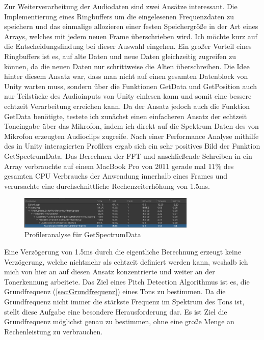Zur Weiterverarbeitung der Audiodaten sind zwei Ansätze interessant. Die Implementierung eines Ringbuffers um die eingelesenen Frequenzdaten zu speichern und das einmalige allozieren einer festen Speichergröße in der Art eines Arrays, welches mit jedem neuen Frame überschrieben wird. Ich möchte kurz auf die Entscheidungsfindung bei dieser Auswahl eingehen. Ein großer Vorteil eines Ringbuffers ist es, auf alte Daten und neue Daten gleichzeitig zugreifen zu können, da die neuen Daten nur schrittweise die Alten überschreiben. Die Idee hinter diesem Ansatz war, dass man nicht auf einen gesamten Datenblock von Unity warten muss, sondern über die Funktionen GetData und GetPosition \cite{unity_doku_micro} auch nur Teilstücke des Audioinputs von Unity einlesen kann und somit eine bessere echtzeit Verarbeitung erreichen kann. Da der Ansatz jedoch auch die Funktion GetData benötigte, testete ich zunächst einen einfacheren Ansatz der echtzeit Toneingabe über das Mikrofon, indem ich direkt auf die Spektrum Daten des von Mikrofon erzeugten Audioclips zugreife. Nach einer Performance Analyse mithilfe des in Unity interagierten Profilers ergab sich ein sehr positives Bild der Funktion GetSpectrumData. Das Berechnen der FFT und anschließende Schreiben in ein Array verbrauchte auf einem MacBook Pro von 2011 gerade mal 11\% des gesamten CPU Verbrauchs der Anwendung innerhalb eines Frames und verursachte eine durchschnittliche Rechenzeiterhöhung von 1.5ms. 
\begin{figure}[h]
    \centering
    \includegraphics[width=0.75\textwidth]{profiler_spectrum.png}
    \caption{Profileranalyse für GetSpectrumData}
    \label{sec:profiler_spectrum}
\end{figure}
Eine Verzögerung von 1.5ms durch die eigentliche Berechnung erzeugt keine Verzögerung, welche nichtmehr als echtzeit definiert werden kann, weshalb ich mich von hier an auf diesen Ansatz konzentrierte und weiter an der Tonerkennung arbeitete. Das Ziel eines Pitch Detection Algorithmus ist es, die Grundfrequenz (\ref{sec:Grundfrequenz}) eines Tons zu bestimmen. Da die Grundfrequenz nicht immer die stärkste Frequenz im Spektrum des Tons ist, stellt diese Aufgabe eine besondere Herausforderung dar. Es ist Ziel die Grundfrequenz möglichst genau zu bestimmen, ohne eine große Menge an Rechenleistung zu verbrauchen. \\
